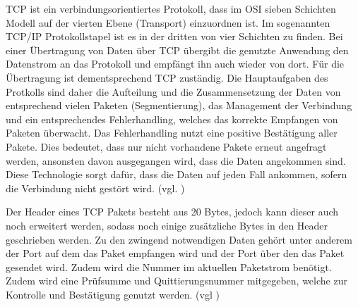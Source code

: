 TCP ist ein verbindungsorientiertes Protokoll, dass im OSI sieben Schichten Modell auf der vierten Ebene (Transport) einzuordnen ist. Im sogenannten TCP/IP Protokollstapel ist es in der dritten von vier Schichten zu finden. Bei einer Übertragung von Daten über TCP übergibt die genutzte Anwendung den Datenstrom an das Protokoll und empfängt ihn auch wieder von dort. Für die Übertragung ist dementsprechend TCP zuständig. Die Hauptaufgaben des Protkolls sind daher die Aufteilung und die Zusammensetzung der Daten von entsprechend vielen Paketen (Segmentierung), das Management der Verbindung und ein entsprechendes Fehlerhandling, welches das korrekte Empfangen von Paketen überwacht. Das Fehlerhandling nutzt eine positive Bestätigung aller Pakete. Dies bedeutet, dass nur nicht vorhandene Pakete erneut angefragt werden, ansonsten davon ausgegangen wird, dass die Daten angekommen sind. Diese Technologie sorgt dafür, dass die Daten auf jeden Fall ankommen, sofern die Verbindung nicht gestört wird. (vgl. \cite{.c}\cite{.22.11.2016})

Der Header eines TCP Pakets besteht aus 20 Bytes, jedoch kann dieser auch noch erweitert werden, sodass noch einige zusätzliche Bytes in den Header geschrieben werden. Zu den zwingend notwendigen Daten gehört unter anderem der Port auf dem das Paket empfangen wird und der Port über den das Paket gesendet wird. Zudem wird die Nummer im aktuellen Paketstrom benötigt. Zudem wird eine Prüfsumme und Quittierungsnummer mitgegeben, welche zur Kontrolle und Bestätigung genutzt werden. (vgl \cite{.c})
